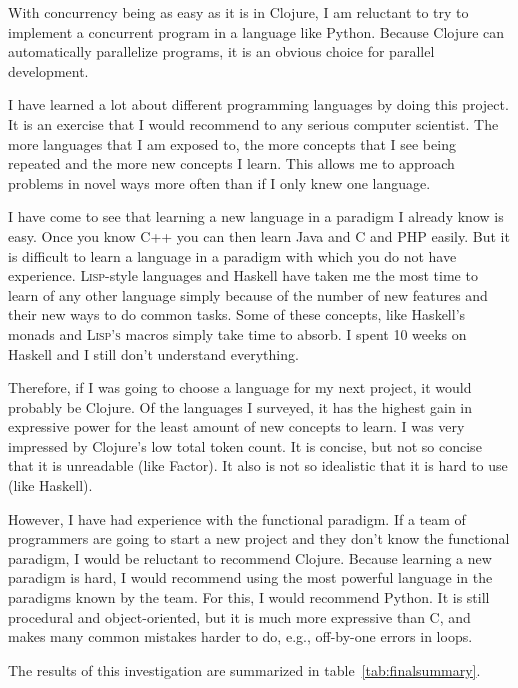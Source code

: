 \documentclass{article}
\begin{document}
With concurrency being as easy as it is in Clojure, I am reluctant to try to
implement a concurrent program in a language like Python.  Because Clojure can
automatically parallelize programs, it is an obvious choice for parallel
development.

I have learned a lot about different programming languages by doing this
project.  It is an exercise that I would recommend to any serious computer
scientist.  The more languages that I am exposed to, the more concepts that I
see being repeated and the more new concepts I learn.  This allows me to
approach problems in novel ways more often than if I only knew one language.

I have come to see that learning a new language in a paradigm I already know is
easy.  Once you know C++ you can then learn Java and C and PHP easily.  But it
is difficult to learn a language in a paradigm with which you do not have
experience.  \textsc{Lisp}-style languages and Haskell have taken me the most
time to learn of any other language simply because of the number of new features
and their new ways to do common tasks.  Some of these concepts, like Haskell's
monads and \textsc{Lisp's} macros simply take time to absorb.  I spent 10 weeks
on Haskell and I still don't understand everything.

Therefore, if I was going to choose a language for my next project, it would
probably be Clojure.  Of the languages I surveyed, it has the highest gain in
expressive power for the least amount of new concepts to learn.  I was very
impressed by Clojure's low total token count.  It is concise, but not so concise
that it is unreadable (like Factor).  It also is not so idealistic that it is
hard to use (like Haskell).

However, I have had experience with the functional paradigm.  If a team of
programmers are going to start a new project and they don't know the functional
paradigm, I would be reluctant to recommend Clojure.  Because learning a new
paradigm is hard, I would recommend using the most powerful language in the
paradigms known by the team.  For this, I would recommend Python.  It is still
procedural and object-oriented, but it is much more expressive than C, and
makes many common mistakes harder to do, e.g., off-by-one errors in loops.

The results of this investigation are summarized in table~\ref{tab:finalsummary}. 
\end{document}
